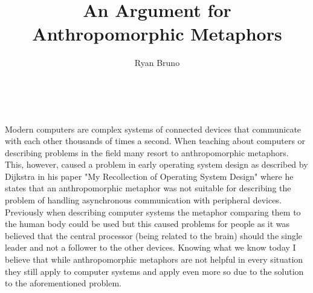 \documentclass{article}
\title{An Argument for Anthropomorphic Metaphors}
\author{Ryan Bruno}
\renewcommand{\maketitle}
{
    \setlength{\parindent}{0px}
    \large\thetitle \\
    \theauthor
    \setlength{\parindent}{4em}
    \normalsize
}
\begin{document}
\maketitle


Modern computers are complex systems of connected devices that communicate with each other thousands of times a second. When teaching about computers or describing problems in the field many resort to anthropomorphic metaphors. This, however, caused a problem in early operating system design as described by Dijkstra in his paper "My Recollection of Operating System Design" \cite{10.1145/1055218.1055219} where he states that an anthropomorphic metaphor was not suitable for describing the problem of handling asynchronous communication with peripheral devices. Previously when describing computer systems the metaphor comparing them to the human body could be used but this caused problems for people as it was believed that the central processor (being related to the brain) should the single leader and not a follower to the other devices. Knowing what we know today I believe that while anthropomorphic metaphors are not helpful in every situation they still apply to computer systems and apply even more so due to the solution to the aforementioned problem.
\end{document}
